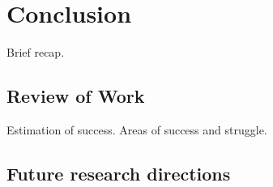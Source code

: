 \chapter{Conclusion} \label{ch:conclusion}

Brief recap.

\section{Review of Work}

Estimation of success. Areas of success and struggle.

\section{Future research directions} \label{sec:future-research-directions}

